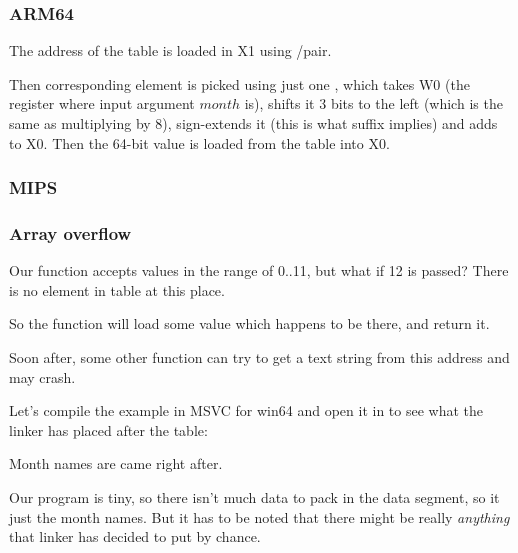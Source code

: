 \subsubsection{ARM64}




The address of the table is loaded in X1 using \ADRP/\ADD pair.

Then corresponding element is picked using just one \LDR, which takes W0 
(the register where input argument $month$ is), shifts it 3 bits to the left (which is the same as multiplying by 8), 
sign-extends it (this is what  suffix implies) and adds to X0.
Then the 64-bit value is loaded from the table into X0.

\subsubsection{MIPS}



\subsubsection{Array overflow}

Our function accepts values in the range of 0..11, but what if 12 is passed?
There is no element in table at this place.

So the function will load some value which happens to be there, and return it.

Soon after, some other function can try to get a text string from this address and may crash.

Let's compile the example in MSVC for win64 and open it in \IDA to see what the linker has placed after the table:



Month names are came right after.

Our program is tiny, so there isn't much data to pack in the data segment, 
so it just the month names.
But it has to be noted that there might be really \emph{anything} that linker has decided to put by chance.

